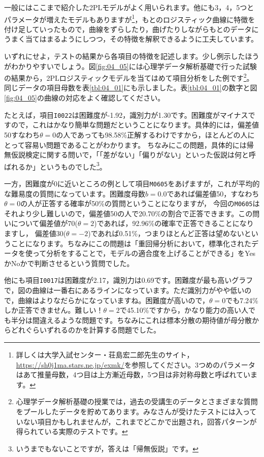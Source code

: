 \documentclass{ltjsbook}
\begin{document}
一般にはここまで紹介した2PLモデルがよく用いられます。他にも3，4，5つとパラメータが増えたモデルもありますが\footnote{詳しくは大学入試センター・荘島宏二郎先生のサイト，\url{https://sh0j1ma.stars.ne.jp/exmk/}を参照してください。3つめのパラメータはあて推量母数，4つ目は上方漸近母数，5つ目は非対称母数と呼ばれています。}，もとのロジスティック曲線に特徴を付け足していったもので，曲線をずらしたり，曲げたりしながらもとのデータにうまく当てはまるようにしつつ，その特徴を解釈できるように工夫しています。

いずれにせよ，テストの結果から各項目の特徴を記述します。少し例示したほうがわかりやすいでしょう。図\ref{fig:04_05}には心理学データ解析基礎で行った試験の結果から，2PLロジスティックモデルを当てはめて項目分析をした例です\footnote{心理学データ解析基礎の授業では，過去の受講生のデータとさまざまな質問をプールしたデータを貯めてあります。みなさんが受けたテストには入っていない項目かもしれませんが，これまでどこかで出題され，回答パターンが得られている実際のテストです。}。同じデータの項目母数を表\ref{tbl:04_01}にも示しました。表\ref{tbl:04_01}の数字と図\ref{fig:04_05}の曲線の対応をよく確認してください。

たとえば，項目\texttt{I0022}は困難度が-1.92，識別力が1.30です。困難度がマイナスですので，これはかなり簡単な問題だということになります。具体的には，偏差値50すなわち$\theta=0$の人であっても98.58\%正解するわけですから，ほとんどの人にとって容易い問題であることがわかります。
ちなみにこの問題，具体的には帰無仮説検定に関する問いで，「「差がない」「偏りがない」といった仮説は何と呼ばれるか」というものでした\footnote{いうまでもないことですが，答えは「帰無仮説」です。}。

一方，困難度が0に近いところの例として項目\texttt{M0605}をあげますが，これが平均的な難易度の質問になっています。困難度母数$b=0.0$であれば偏差値50，すなわち$\theta=0$の人が正答する確率が50\%の質問ということになりますが，
今回の\texttt{M0605}はそれより少し難しいので，偏差値50の人で20.70\%の割合で正答できます。この問いについて偏差値が70($\theta=2$)であれば，92.96\%の確率で正答できることになりますし，
偏差値30($\theta=-2$)であれば0.51\%，つまりほとんど正答は望めないということになります。ちなみにこの問題は「重回帰分析において，標準化されたデータを使って分析をすることで，モデルの適合度を上げることができる」をYesかNoかで判断させるという質問でした。

他にも項目\texttt{I0017}は困難度が2.17，識別力は0.69です。困難度が最も高いグラフで，図の曲線は一番右にあるラインになっています。ただ識別力がやや低いので，曲線はよりなだらかになっていますね。困難度が高いので，$\theta=0$でも7.24\%しか正答できません。難しい！$\theta=2$で45.10\%ですから，かなり能力の高い人でも半分は間違えるような問題です。ちなみにこれは標本分散の期待値が母分散からどれぐらいずれるのかを計算する問題でした。
\end{document}
